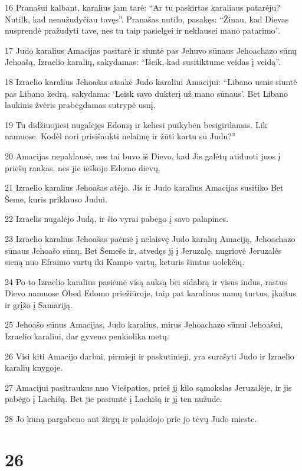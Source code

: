 \par 16 Pranašui kalbant, karalius jam tarė: “Ar tu paskirtas karaliaus patarėju? Nutilk, kad nenužudyčiau tavęs”. Pranašas nutilo, pasakęs: “Žinau, kad Dievas nusprendė pražudyti tave, nes tu taip pasielgei ir neklausei mano patarimo”. 
\par 17 Judo karalius Amacijas pasitarė ir siuntė pas Jehuvo sūnaus Jehoachazo sūnų Jehoašą, Izraelio karalių, sakydamas: “Išeik, kad susitiktume veidas į veidą”. 
\par 18 Izraelio karalius Jehoašas atsakė Judo karaliui Amacijui: “Libano usnis siuntė pas Libano kedrą, sakydama: ‘Leisk savo dukterį už mano sūnaus’. Bet Libano laukinis žvėris prabėgdamas sutrypė usnį. 
\par 19 Tu didžiuojiesi nugalėjęs Edomą ir keliesi puikybėn besigirdamas. Lik namuose. Kodėl nori prisišaukti nelaimę ir žūti kartu su Judu?” 
\par 20 Amacijas nepaklausė, nes tai buvo iš Dievo, kad Jis galėtų atiduoti juos į priešų rankas, nes jie ieškojo Edomo dievų. 
\par 21 Izraelio karalius Jehoašas atėjo. Jis ir Judo karalius Amacijas susitiko Bet Šeme, kuris priklauso Judui. 
\par 22 Izraelis nugalėjo Judą, ir šio vyrai pabėgo į savo palapines. 
\par 23 Izraelio karalius Jehoašas paėmė į nelaisvę Judo karalių Amaciją, Jehoachazo sūnaus Jehoašo sūnų, Bet Šemeše ir, atvedęs jį į Jeruzalę, nugriovė Jeruzalės sieną nuo Efraimo vartų iki Kampo vartų, keturis šimtus uolekčių. 
\par 24 Po to Izraelio karalius pasiėmė visą auksą bei sidabrą ir visus indus, rastus Dievo namuose Obed Edomo priežiūroje, taip pat karaliaus namų turtus, įkaitus ir grįžo į Samariją. 
\par 25 Jehoašo sūnus Amacijas, Judo karalius, mirus Jehoachazo sūnui Jehoašui, Izraelio karaliui, dar gyveno penkiolika metų. 
\par 26 Visi kiti Amacijo darbai, pirmieji ir paskutinieji, yra surašyti Judo ir Izraelio karalių knygoje. 
\par 27 Amacijui pasitraukus nuo Viešpaties, prieš jį kilo sąmokslas Jeruzalėje, ir jis pabėgo į Lachišą. Bet jie pasiuntė į Lachišą ir jį ten nužudė. 
\par 28 Jo kūną pargabeno ant žirgų ir palaidojo prie jo tėvų Judo mieste.



\chapter{26}

